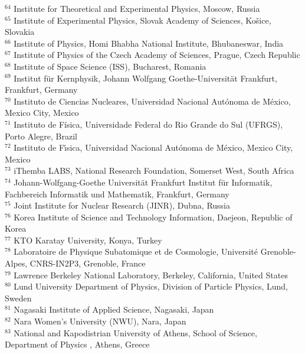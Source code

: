 \begin{flushleft}
$^{64}$ Institute for Theoretical and Experimental Physics, Moscow, Russia\\
$^{65}$ Institute of Experimental Physics, Slovak Academy of Sciences, Ko\v{s}ice, Slovakia\\
$^{66}$ Institute of Physics, Homi Bhabha National Institute, Bhubaneswar, India\\
$^{67}$ Institute of Physics of the Czech Academy of Sciences, Prague, Czech Republic\\
$^{68}$ Institute of Space Science (ISS), Bucharest, Romania\\
$^{69}$ Institut f\"{u}r Kernphysik, Johann Wolfgang Goethe-Universit\"{a}t Frankfurt, Frankfurt, Germany\\
$^{70}$ Instituto de Ciencias Nucleares, Universidad Nacional Aut\'{o}noma de M\'{e}xico, Mexico City, Mexico\\
$^{71}$ Instituto de F\'{i}sica, Universidade Federal do Rio Grande do Sul (UFRGS), Porto Alegre, Brazil\\
$^{72}$ Instituto de F\'{\i}sica, Universidad Nacional Aut\'{o}noma de M\'{e}xico, Mexico City, Mexico\\
$^{73}$ iThemba LABS, National Research Foundation, Somerset West, South Africa\\
$^{74}$ Johann-Wolfgang-Goethe Universit\"{a}t Frankfurt Institut f\"{u}r Informatik, Fachbereich Informatik und Mathematik, Frankfurt, Germany\\
$^{75}$ Joint Institute for Nuclear Research (JINR), Dubna, Russia\\
$^{76}$ Korea Institute of Science and Technology Information, Daejeon, Republic of Korea\\
$^{77}$ KTO Karatay University, Konya, Turkey\\
$^{78}$ Laboratoire de Physique Subatomique et de Cosmologie, Universit\'{e} Grenoble-Alpes, CNRS-IN2P3, Grenoble, France\\
$^{79}$ Lawrence Berkeley National Laboratory, Berkeley, California, United States\\
$^{80}$ Lund University Department of Physics, Division of Particle Physics, Lund, Sweden\\
$^{81}$ Nagasaki Institute of Applied Science, Nagasaki, Japan\\
$^{82}$ Nara Women{'}s University (NWU), Nara, Japan\\
$^{83}$ National and Kapodistrian University of Athens, School of Science, Department of Physics , Athens, Greece\\

\end{flushleft}
